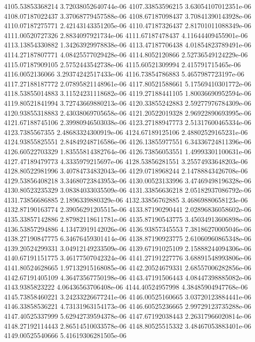 {4105.53853368214 3.72038052640744e-06
4107.33853596215 3.63054107012351e-06
4108.07187022437 3.37068779457588e-06
4108.67187098437 3.70841390143928e-06
4110.07187275771 2.42143143351205e-06
4110.47187326437 2.81701011088349e-06
4111.00520727326 2.8834097921734e-06
4111.67187478437 4.11644409455901e-06
4113.13854330882 1.34263929978838e-06
4113.47187706438 4.01854823789491e-06
4114.27187807771 4.08425577029428e-06
4114.8052120866 2.52736549124229e-06
4115.07187909105 2.5752443542738e-06
4115.60521309994 2.415791715465e-06
4116.0052136066 3.29374242517433e-06
4116.73854786883 5.4657987723197e-06
4117.27188187772 2.07895821148961e-06
4117.80521588661 5.17569410301772e-06
4118.53855014883 3.11524231118682e-06
4119.27188441105 1.80036690952594e-06
4119.80521841994 3.72743669880213e-06
4120.33855242883 2.59277976784309e-06
4120.93855318883 2.43038069705658e-06
4121.20522019328 2.96922890693995e-06
4121.67188745106 2.39980946503038e-06
4123.27188947773 2.51317600465334e-06
4123.7385567355 2.48683324300919e-06
4124.67189125106 2.48802529165231e-06
4124.93855825551 2.84849248716586e-06
4126.13855977551 6.34336724811396e-06
4126.60522703329 1.83555814382764e-06
4126.73856053551 1.49993301100631e-06
4127.47189479773 4.3335979215697e-06
4128.53856281551 3.25574933648203e-06
4128.80522981996 3.40784734832043e-06
4129.0718968244 2.14788843426708e-06
4129.53856408218 3.34680723843953e-06
4130.00523133996 3.47469498196328e-06
4130.80523235329 3.08384033035509e-06
4131.33856636218 2.05182937086792e-06
4131.73856686885 2.1896339880329e-06
4132.33856762885 3.46869880658123e-06
4132.87190163774 2.39056291205515e-06
4133.87190290441 2.02896836058602e-06
4135.33857142886 2.87982118611781e-06
4135.87190543775 3.45034913606898e-06
4136.53857294886 4.13473919142026e-06
4136.93857345553 7.38186270005046e-06
4138.27190847775 6.34676459301414e-06
4138.87190923775 2.61060960865348e-06
4139.20524299331 3.04912149233509e-06
4139.67191025109 2.15888244094306e-06
4140.67191151775 3.46177507042324e-06
4141.27191227776 3.68891548993806e-06
4141.80524628665 1.97132915168085e-06
4142.20524679331 2.68557006282856e-06
4142.67191405109 4.36473567750198e-06
4143.47191506443 4.08447398885082e-06
4143.9385823222 4.06436563706408e-06
4144.40524957998 4.38485904947768e-06
4145.73858460221 3.24233226677241e-06
4146.00525160665 3.03720123884441e-06
4146.33858536221 4.73131963154173e-06
4146.60525236665 2.99729123735288e-06
4147.40525337999 5.62942739594378e-06
4147.67192038443 2.26317966020814e-06
4148.27192114443 2.86514510033578e-06
4148.80525515332 3.48467053883401e-06
4149.00525540666 5.41619306281505e-06
}
